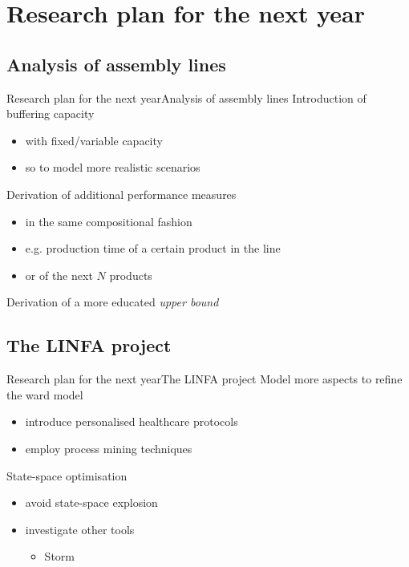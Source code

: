 
\section{Research plan for the next year}
  \subsection{Analysis of assembly lines}
    \begin{frame}{Research plan for the next year}{Analysis of assembly lines}
      Introduction of buffering capacity
      \begin{itemize}
        \item with fixed/variable capacity
        \item so to model more realistic scenarios
      \end{itemize}
      
      \vspace{1em}
      Derivation of additional performance measures
      \begin{itemize}
        \item in the same compositional fashion
        \item e.g. production time of a certain product in the line
        \item or of the next $N$ products
      \end{itemize}
      
      \vspace{1em}
      Derivation of a more educated \textit{upper bound}
    \end{frame}
    
  \subsection{The LINFA project}
    \begin{frame}{Research plan for the next year}{The LINFA project}
      Model more aspects to refine the ward model
      \begin{itemize}
        \item introduce personalised healthcare protocols
        \item employ process mining techniques
      \end{itemize}
      
      \vspace{1.5em}
      State-space optimisation
      \begin{itemize}
        \item avoid state-space explosion
        \item investigate other tools
        \begin{itemize}
          \item Storm
        \end{itemize}
      \end{itemize}
    \end{frame}
    
